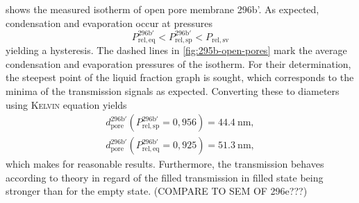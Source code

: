 \documentclass[../thesis.tex]{subfiles}
\begin{document}
         shows the measured isotherm of open pore membrane 296b'. As expected, condensation and evaporation occur at pressures
        \begin{equation*}
          P_\mathrm{rel,eq}^\mathrm{296b'} < P_\mathrm{rel,sp}^\mathrm{296b'} < P_\mathrm{rel,sv}
        \end{equation*}
        yielding a hysteresis. The dashed lines in \cref{fig:295b-open-pores} mark the average condensation and evaporation pressures of the isotherm. For their determination, the steepest point of the liquid fraction graph is sought, which corresponds to the minima of the transmission signals as expected. Converting these to diameters using \textsc{Kelvin} equation yields
        \begin{align*}
          d_\mathrm{pore}^\mathrm{296b'}(P_\mathrm{rel,sp}^\mathrm{296b'}=0,956)=\SI{44,4}{\nano\meter}, \\
          d_\mathrm{pore}^\mathrm{296b'}(P_\mathrm{rel,eq}^\mathrm{296b'}=0,925)=\SI{51,3}{\nano\meter},
        \end{align*}
        which makes for reasonable results. Furthermore, the transmission behaves according to theory in regard of the filled transmission in filled state being stronger than for the empty state.  (COMPARE TO SEM OF 296e???)
        \medskip

        
\end{document}
